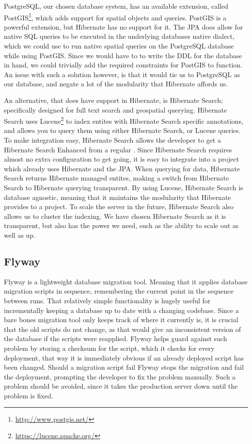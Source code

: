 PostgreSQL, our chosen database system, has an available extension, called PostGIS\footnote{\url{http://www.postgis.net/}}, which adds support for spatial objects and queries.
PostGIS is a powerful extension, but Hibernate has no support for it.
The \ac{JPA} does allow for native \ac{SQL} queries to be executed in the underlying databases native dialect, which we could use to run native spatial queries on the PostgreSQL database while using PostGIS.
Since we would have to to write the \ac{DDL} for the database in hand, we could trivially add the required constraints for PostGIS to function.
An issue with such a solution however, is that it would tie us to PostgreSQL as our database, and negate a lot of the modularity that Hibernate affords us.

An alternative, that does have support in Hibernate, is Hibernate Search; specifically designed for full text search and geospatial querying.
Hibernate Search uses Lucene\footnote{\url{https://lucene.apache.org/}} to index entites with Hibernate Search specific annotations, and allows you to query them using either Hibernate Search, or Lucene queries.
To make integration easy, Hibernate Search allows the developer to get a Hibernate Search Enhanced  from a regular .
Since Hibernate Search requires almost no extra configuration to get going, it is easy to integrate into a project which already uses Hibernate and the \ac{JPA}.
When querying for data, Hibernate Search returns Hibernate managed entites, making a switch from Hibernate Search to Hibernate querying  transparent.
By using Lucene, Hibernate Search is database agnostic, meaning that it maintains the modularity that Hibernate provides to a project.
To scale the server in the future, Hibernate Search also allows us to cluster the indexing.
We have chosen Hibernate Search as it is transparent, but also has the power we need, such as the ability to scale out as well as up.

\subsection{Flyway}\label{subsubsec:flyway}
Flyway is a lightweight database migration tool.
Meaning that it applies database migration scripts in sequence, remembering the current point in the sequence between runs.
That relatively simple functionality is hugely useful for incrementally keeping a database up to date with a changing codebase.
Since a bare bones migration tool only keeps track of where it currently is, it is crucial that the old scripts do not change, as that would give an inconsistent version of the database if the scripts were reapplied.
Flyway helps guard against such problem by storing a checksum for the script, which it checks for every deployment, that way it is immediately obvious if an already deployed script has been changed.
Should a migration script fail Flyway stops the migration and fail the deployment, prompting the developer to fix the problem manually.
Such a problem should be avoided, since it takes the production server down until the problem is fixed.

